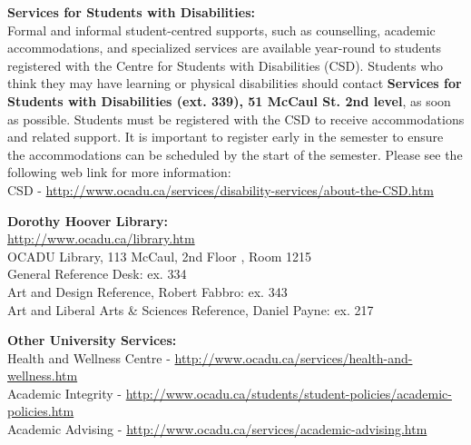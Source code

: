 \documentclass[10pt]{article}
\begin{document}
\textbf{Services for Students with Disabilities:}\\
Formal and informal student-centred supports, such as counselling, academic accommodations, and specialized services are available year-round to students registered with the Centre for Students with Disabilities (CSD). Students who think they may have learning or physical disabilities should contact \textbf{Services for Students with Disabilities (ext. 339), 51 McCaul St. 2nd level}, as soon as possible. Students must be registered with the CSD to receive accommodations and related support. It is important to register early in the semester to ensure the accommodations can be scheduled by the start of the semester.  Please see the following web link for more information:\\ CSD - \url{http://www.ocadu.ca/services/disability-services/about-the-CSD.htm} 

\textbf{Dorothy Hoover Library:}\\
\url{http://www.ocadu.ca/library.htm} \\
OCADU Library, 113 McCaul, 2nd Floor , Room 1215 \\
General Reference Desk: ex. 334 \\
Art and Design Reference, Robert Fabbro: ex. 343 \\
Art and Liberal Arts \& Sciences Reference, Daniel Payne: ex. 217 

\textbf{Other University Services:}\\
Health and Wellness Centre - \url{http://www.ocadu.ca/services/health-and-wellness.htm} \\
Academic Integrity - \url{http://www.ocadu.ca/students/student-policies/academic-policies.htm} \\
Academic Advising - \url{http://www.ocadu.ca/services/academic-advising.htm} 

\end{document}
